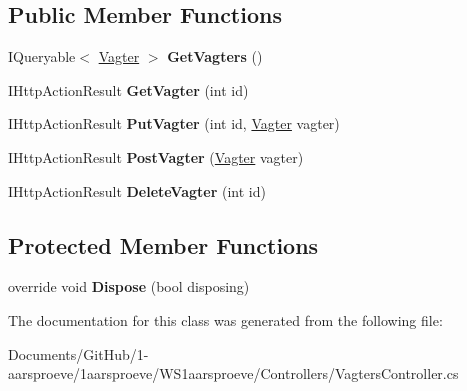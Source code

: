 \subsection*{Public Member Functions}
\begin{DoxyCompactItemize}
\item 
\hypertarget{class_w_s1aarsproeve_1_1_controllers_1_1_vagters_controller_a7322965b2516afd6b9851eebb3933d0d}{}I\+Queryable$<$ \hyperlink{class_w_s1aarsproeve_1_1_vagter}{Vagter} $>$ {\bfseries Get\+Vagters} ()\label{class_w_s1aarsproeve_1_1_controllers_1_1_vagters_controller_a7322965b2516afd6b9851eebb3933d0d}

\item 
\hypertarget{class_w_s1aarsproeve_1_1_controllers_1_1_vagters_controller_a540a3264922989970e05d7ef3877583a}{}I\+Http\+Action\+Result {\bfseries Get\+Vagter} (int id)\label{class_w_s1aarsproeve_1_1_controllers_1_1_vagters_controller_a540a3264922989970e05d7ef3877583a}

\item 
\hypertarget{class_w_s1aarsproeve_1_1_controllers_1_1_vagters_controller_aaa972db4016b725b2018b6f5761ffd27}{}I\+Http\+Action\+Result {\bfseries Put\+Vagter} (int id, \hyperlink{class_w_s1aarsproeve_1_1_vagter}{Vagter} vagter)\label{class_w_s1aarsproeve_1_1_controllers_1_1_vagters_controller_aaa972db4016b725b2018b6f5761ffd27}

\item 
\hypertarget{class_w_s1aarsproeve_1_1_controllers_1_1_vagters_controller_a8a4bee3e12b81db08cd3113b1af5f2c4}{}I\+Http\+Action\+Result {\bfseries Post\+Vagter} (\hyperlink{class_w_s1aarsproeve_1_1_vagter}{Vagter} vagter)\label{class_w_s1aarsproeve_1_1_controllers_1_1_vagters_controller_a8a4bee3e12b81db08cd3113b1af5f2c4}

\item 
\hypertarget{class_w_s1aarsproeve_1_1_controllers_1_1_vagters_controller_ac1125b41a98b3a99d301980fb1018b39}{}I\+Http\+Action\+Result {\bfseries Delete\+Vagter} (int id)\label{class_w_s1aarsproeve_1_1_controllers_1_1_vagters_controller_ac1125b41a98b3a99d301980fb1018b39}

\end{DoxyCompactItemize}
\subsection*{Protected Member Functions}
\begin{DoxyCompactItemize}
\item 
\hypertarget{class_w_s1aarsproeve_1_1_controllers_1_1_vagters_controller_a0b935af7f039b2368cc12a03e10cddc8}{}override void {\bfseries Dispose} (bool disposing)\label{class_w_s1aarsproeve_1_1_controllers_1_1_vagters_controller_a0b935af7f039b2368cc12a03e10cddc8}

\end{DoxyCompactItemize}


The documentation for this class was generated from the following file\+:\begin{DoxyCompactItemize}
\item 
Documents/\+Git\+Hub/1-\/aarsproeve/1aarsproeve/\+W\+S1aarsproeve/\+Controllers/Vagters\+Controller.\+cs\end{DoxyCompactItemize}
